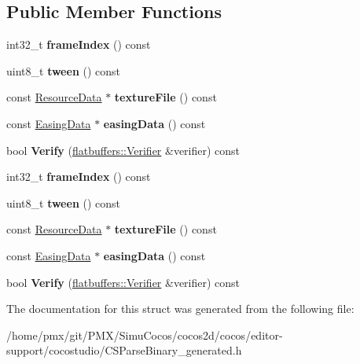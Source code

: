 \subsection*{Public Member Functions}
\begin{DoxyCompactItemize}
\item 
\mbox{\label{structflatbuffers_1_1TextureFrame_a74ab1e6e181eaaffd60b8cf2444c6dae}} 
int32\+\_\+t {\bfseries frame\+Index} () const
\item 
\mbox{\label{structflatbuffers_1_1TextureFrame_a68eee4c4b0785d6654a220a1862344de}} 
uint8\+\_\+t {\bfseries tween} () const
\item 
\mbox{\label{structflatbuffers_1_1TextureFrame_ac3d8cd90bb197a2cfcb67d0d89780139}} 
const \hyperlink{structflatbuffers_1_1ResourceData}{Resource\+Data} $\ast$ {\bfseries texture\+File} () const
\item 
\mbox{\label{structflatbuffers_1_1TextureFrame_a8a31a0914906174f1f379c49696997b1}} 
const \hyperlink{structflatbuffers_1_1EasingData}{Easing\+Data} $\ast$ {\bfseries easing\+Data} () const
\item 
\mbox{\label{structflatbuffers_1_1TextureFrame_a1c5ed63483444e6c925dd6a8409e22c2}} 
bool {\bfseries Verify} (\hyperlink{classflatbuffers_1_1Verifier}{flatbuffers\+::\+Verifier} \&verifier) const
\item 
\mbox{\label{structflatbuffers_1_1TextureFrame_a74ab1e6e181eaaffd60b8cf2444c6dae}} 
int32\+\_\+t {\bfseries frame\+Index} () const
\item 
\mbox{\label{structflatbuffers_1_1TextureFrame_a68eee4c4b0785d6654a220a1862344de}} 
uint8\+\_\+t {\bfseries tween} () const
\item 
\mbox{\label{structflatbuffers_1_1TextureFrame_ac3d8cd90bb197a2cfcb67d0d89780139}} 
const \hyperlink{structflatbuffers_1_1ResourceData}{Resource\+Data} $\ast$ {\bfseries texture\+File} () const
\item 
\mbox{\label{structflatbuffers_1_1TextureFrame_a8a31a0914906174f1f379c49696997b1}} 
const \hyperlink{structflatbuffers_1_1EasingData}{Easing\+Data} $\ast$ {\bfseries easing\+Data} () const
\item 
\mbox{\label{structflatbuffers_1_1TextureFrame_a1c5ed63483444e6c925dd6a8409e22c2}} 
bool {\bfseries Verify} (\hyperlink{classflatbuffers_1_1Verifier}{flatbuffers\+::\+Verifier} \&verifier) const
\end{DoxyCompactItemize}


The documentation for this struct was generated from the following file\+:\begin{DoxyCompactItemize}
\item 
/home/pmx/git/\+P\+M\+X/\+Simu\+Cocos/cocos2d/cocos/editor-\/support/cocostudio/C\+S\+Parse\+Binary\+\_\+generated.\+h\end{DoxyCompactItemize}
